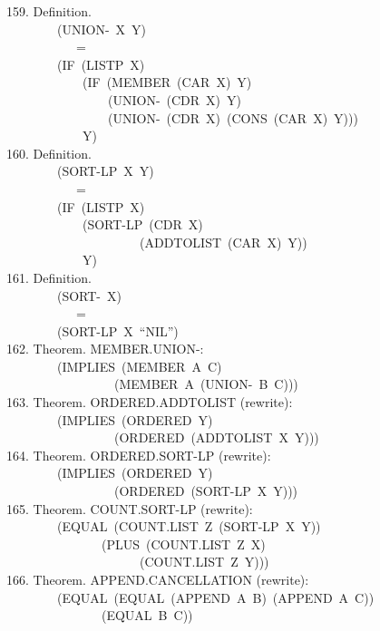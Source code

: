 \documentclass[10pt]{book}
\newenvironment{pubasis}{\begin{flushleft}}{\end{flushleft}}
\begin{document}
\begin{pubasis}
159.    Definition.\\
~~~~~~~~(UNION-~X~Y)\\
~~~~~~~~~~~=\\
~~~~~~~~(IF~(LISTP~X)\\
~~~~~~~~~~~~(IF~(MEMBER~(CAR~X)~Y)\\
~~~~~~~~~~~~~~~~(UNION-~(CDR~X)~Y)\\
~~~~~~~~~~~~~~~~(UNION-~(CDR~X)~(CONS~(CAR~X)~Y)))\\
~~~~~~~~~~~~Y)\\

160.    Definition.\\
~~~~~~~~(SORT-LP~X~Y)\\
~~~~~~~~~~~=\\
~~~~~~~~(IF~(LISTP~X)\\
~~~~~~~~~~~~(SORT-LP~(CDR~X)\\
~~~~~~~~~~~~~~~~~~~~~(ADDTOLIST~(CAR~X)~Y))\\
~~~~~~~~~~~~Y)\\

161.    Definition.\\
~~~~~~~~(SORT-~X)\\
~~~~~~~~~~~=\\
~~~~~~~~(SORT-LP~X~``NIL'')\\

162.    Theorem.  MEMBER.UNION-:\\
~~~~~~~~(IMPLIES~(MEMBER~A~C)\\
~~~~~~~~~~~~~~~~~(MEMBER~A~(UNION-~B~C)))\\

163.    Theorem.  ORDERED.ADDTOLIST (rewrite):\\
~~~~~~~~(IMPLIES~(ORDERED~Y)\\
~~~~~~~~~~~~~~~~~(ORDERED~(ADDTOLIST~X~Y)))\\

164.    Theorem.  ORDERED.SORT-LP (rewrite):\\
~~~~~~~~(IMPLIES~(ORDERED~Y)\\
~~~~~~~~~~~~~~~~~(ORDERED~(SORT-LP~X~Y)))\\

165.    Theorem.  COUNT.SORT-LP (rewrite):\\
~~~~~~~~(EQUAL~(COUNT.LIST~Z~(SORT-LP~X~Y))\\
~~~~~~~~~~~~~~~(PLUS~(COUNT.LIST~Z~X)\\
~~~~~~~~~~~~~~~~~~~~~(COUNT.LIST~Z~Y)))\\

166.    Theorem.  APPEND.CANCELLATION (rewrite):\\
~~~~~~~~(EQUAL~(EQUAL~(APPEND~A~B)~(APPEND~A~C))\\
~~~~~~~~~~~~~~~(EQUAL~B~C))\\


\end{pubasis}
\end{document}
